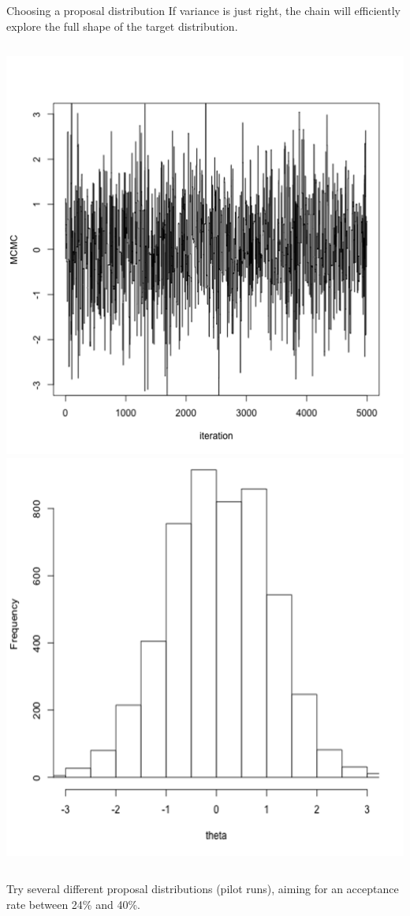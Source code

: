 \documentclass[compress]{beamer}
\begin{document}
\begin{frame}[label=sec-8-5]{Choosing a proposal distribution}
    If \alert{variance is just right}, the chain will efficiently explore the full shape of the target distribution.
    \begin{columns}[c] 
    \includegraphics[width=0.8\linewidth]{Var3}
    \includegraphics[width=0.8\linewidth]{Trace3}
\end{columns}  
Try several different proposal distributions (\alert{pilot runs}), aiming for an acceptance rate between 24\%  and 40\%. 
\end{frame}
\end{document}
